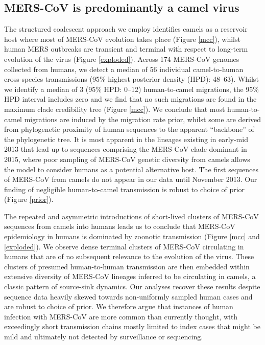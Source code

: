 \documentclass[11pt,oneside,letterpaper]{article}
\begin{document}
\subsection*{MERS-CoV is predominantly a camel virus}
The structured coalescent approach we employ \citep{vaughan_efficient_2014} identifies camels as a reservoir host where most of MERS-CoV evolution takes place (Figure \ref{mcc}), whilst human MERS outbreaks are transient and terminal with respect to long-term evolution of the virus (Figure \ref{exploded}).
Across 174 MERS-CoV genomes collected from humans, we detect a median of 56 individual camel-to-human cross-species transmissions (95\% highest posterior density (HPD): 48--63).
Whilst we identify a median of 3 (95\% HPD: 0--12) human-to-camel migrations, the 95\% HPD interval includes zero and we find that no such migrations are found in the maximum clade credibility tree (Figure \ref{mcc}).
We conclude that most human-to-camel migrations are induced by the migration rate prior, whilst some are derived from phylogenetic proximity of human sequences to the apparent ``backbone'' of the phylogenetic tree.
It is most apparent in the lineages existing in early-mid 2013 that lead up to sequences comprising the MERS-CoV clade dominant in 2015, where poor sampling of MERS-CoV genetic diversity from camels allows the model to consider humans as a potential alternative host.
The first sequences of MERS-CoV from camels do not appear in our data until November 2013.
Our finding of negligible human-to-camel transmission is robust to choice of prior (Figure \ref{prior}).

The repeated and asymmetric introductions of short-lived clusters of MERS-CoV sequences from camels into humans leads us to conclude that MERS-CoV epidemiology in humans is dominated by zoonotic transmission (Figure \ref{mcc} and \ref{exploded}).
We observe dense terminal clusters of MERS-CoV circulating in humans that are of no subsequent relevance to the evolution of the virus.
These clusters of presumed human-to-human transmission are then embedded within extensive diversity of MERS-CoV lineages inferred to be circulating in camels, a classic pattern of source-sink dynamics.
Our analyses recover these results despite sequence data heavily skewed towards non-uniformly sampled human cases and are robust to choice of prior.
We therefore argue that instances of human infection with MERS-CoV are more common than currently thought, with exceedingly short transmission chains mostly limited to index cases that might be mild and ultimately not detected by surveillance or sequencing.
\end{document}

